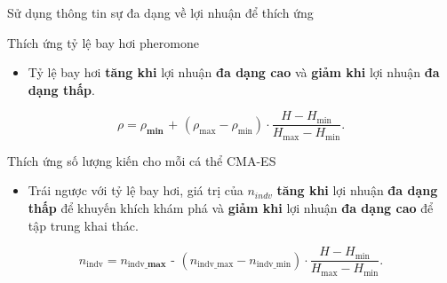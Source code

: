 \documentclass[aspectratio=169]{beamer}
\begin{document}
\begin{frame}{Sử dụng thông tin sự đa dạng về lợi nhuận để thích ứng}
    \begin{block}{Thích ứng tỷ lệ bay hơi pheromone}
        \vspace{0.1cm}
        \begin{itemize}
            \item Tỷ lệ bay hơi \textbf{tăng khi} lợi nhuận \textbf{đa dạng cao} và \textbf{giảm khi} lợi nhuận \textbf{đa dạng thấp}.
        \end{itemize}
        \begin{equation}\label{eq:adaptrho}
            \rho = \rho_{\textbf{min}} \textbf{ + } (\rho_{\text{max}} - \rho_{\text{min}}) \cdot \frac{H - H_{\text{min}}}{H_{\text{max}} - H_{\text{min}}}.
        \end{equation}
        \vspace{0.1cm}
    \end{block}
    \begin{block}{Thích ứng số lượng kiến cho mỗi cá thể CMA-ES}
        \vspace{0.1cm}
        \begin{itemize}
            \item Trái ngược với tỷ lệ bay hơi, giá trị của $n_{indv}$ \textbf{tăng khi} lợi nhuận \textbf{đa dạng thấp} để khuyến khích khám phá và \textbf{giảm khi} lợi nhuận \textbf{đa dạng cao} để tập trung khai thác.
        \end{itemize}
        \begin{equation} \label{eq:adaptants}
            n_{\text{indv}} = n_{\text{indv\_}\textbf{max}} \textbf{ - } (n_{\text{indv\_max}} - n_{\text{indv\_min}}) \cdot \frac{H - H_{\text{min}}}{H_{\text{max}} - H_{\text{min}}}.
        \end{equation}
        \vspace{0.1cm}
    \end{block}
\end{frame}
\end{document}
